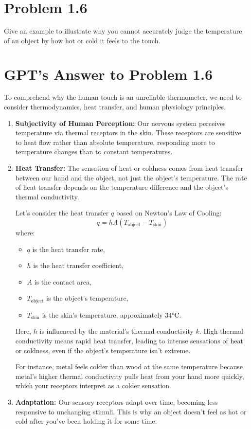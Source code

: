 \documentclass[12pt]{article}
\begin{document}
\section*{Problem 1.6}

Give an example to illustrate why you cannot accurately judge the
temperature of an object by how hot or cold it feels to the touch.

\section*{GPT's Answer to Problem 1.6}

To comprehend why the human touch is an unreliable thermometer, we need to consider thermodynamics, heat transfer, and human physiology principles.

\begin{enumerate}
  \item \textbf{Subjectivity of Human Perception:} Our nervous system perceives temperature via thermal receptors in the skin. These receptors are sensitive to heat flow rather than absolute temperature, responding more to temperature changes than to constant temperatures.

  \item \textbf{Heat Transfer:} The sensation of heat or coldness comes from heat transfer between our hand and the object, not just the object's temperature. The rate of heat transfer depends on the temperature difference and the object's thermal conductivity.

Let's consider the heat transfer \( q \) based on Newton's Law of Cooling:
\[
q = hA(T_{\text{object}} - T_{\text{skin}})
\]
where:
\begin{itemize}
  \item \( q \) is the heat transfer rate,
  \item \( h \) is the heat transfer coefficient,
  \item \( A \) is the contact area,
  \item \( T_{\text{object}} \) is the object's temperature,
  \item \( T_{\text{skin}} \) is the skin's temperature, approximately 34°C.
\end{itemize}

Here, \( h \) is influenced by the material's thermal conductivity \( k \). High thermal conductivity means rapid heat transfer, leading to intense sensations of heat or coldness, even if the object's temperature isn't extreme.

For instance, metal feels colder than wood at the same temperature because metal's higher thermal conductivity pulls heat from your hand more quickly, which your receptors interpret as a colder sensation.

  \item \textbf{Adaptation:} Our sensory receptors adapt over time, becoming less responsive to unchanging stimuli. This is why an object doesn't feel as hot or cold after you've been holding it for some time.
\end{enumerate}
\end{document}
